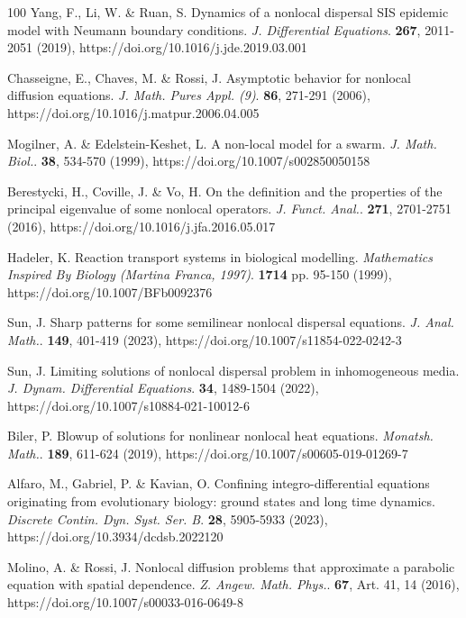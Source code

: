 \documentclass[12pt, a4paper]{article}
\theoremstyle{break}
\theoremstyle{break}
\theoremstyle{break}
\theoremstyle{break}
\theoremstyle{break}
\begin{document}
\begin{thebibliography}{100}
    Yang, F., Li, W. \& Ruan, S. Dynamics of a nonlocal dispersal SIS epidemic model with Neumann boundary conditions. {\em J. Differential Equations}. \textbf{267}, 2011-2051 (2019), https://doi.org/10.1016/j.jde.2019.03.001
    
    Chasseigne, E., Chaves, M. \& Rossi, J. Asymptotic behavior for nonlocal diffusion equations. {\em J. Math. Pures Appl. (9)}. \textbf{86}, 271-291 (2006), https://doi.org/10.1016/j.matpur.2006.04.005
    
    Mogilner, A. \& Edelstein-Keshet, L. A non-local model for a swarm. {\em J. Math. Biol.}. \textbf{38}, 534-570 (1999), https://doi.org/10.1007/s002850050158
    
    Berestycki, H., Coville, J. \& Vo, H. On the definition and the properties of the principal eigenvalue of some nonlocal operators. {\em J. Funct. Anal.}. \textbf{271}, 2701-2751 (2016), https://doi.org/10.1016/j.jfa.2016.05.017
    
    Hadeler, K. Reaction transport systems in biological modelling. {\em Mathematics Inspired By Biology (Martina Franca, 1997)}. \textbf{1714} pp. 95-150 (1999), https://doi.org/10.1007/BFb0092376
    
    Sun, J. Sharp patterns for some semilinear nonlocal dispersal equations. {\em J. Anal. Math.}. \textbf{149}, 401-419 (2023), https://doi.org/10.1007/s11854-022-0242-3
    
    Sun, J. Limiting solutions of nonlocal dispersal problem in inhomogeneous media. {\em J. Dynam. Differential Equations}. \textbf{34}, 1489-1504 (2022), https://doi.org/10.1007/s10884-021-10012-6
    
    Biler, P. Blowup of solutions for nonlinear nonlocal heat equations. {\em Monatsh. Math.}. \textbf{189}, 611-624 (2019), https://doi.org/10.1007/s00605-019-01269-7
    
    Alfaro, M., Gabriel, P. \& Kavian, O. Confining integro-differential equations originating from evolutionary biology: ground states and long time dynamics. {\em Discrete Contin. Dyn. Syst. Ser. B}. \textbf{28}, 5905-5933 (2023), https://doi.org/10.3934/dcdsb.2022120
    
    Molino, A. \& Rossi, J. Nonlocal diffusion problems that approximate a parabolic equation with spatial dependence. {\em Z. Angew. Math. Phys.}. \textbf{67}, Art. 41, 14 (2016), https://doi.org/10.1007/s00033-016-0649-8
    

\end{thebibliography}
\end{document}
